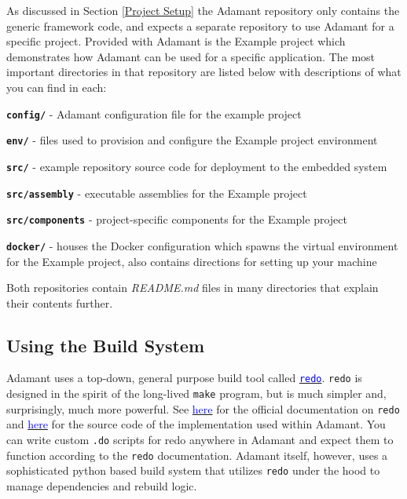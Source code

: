 \vspace{5mm} %

As discussed in Section \ref{Project Setup} the Adamant repository only contains the generic framework code, and expects a separate repository to use Adamant for a specific project. Provided with Adamant is the Example project which demonstrates how Adamant can be used for a specific application. The most important directories in that repository are listed below with descriptions of what you can find in each:

\vspace{5mm} %
\begin{spaceditemize}
  \item \textbf{\texttt{config/}} - Adamant configuration file for the example project
  \item \textbf{\texttt{env/}} - files used to provision and configure the Example project environment
  \item \textbf{\texttt{src/}} - example repository source code for deployment to the embedded system
  \item \textbf{\texttt{src/assembly}} - executable assemblies for the Example project
  \item \textbf{\texttt{src/components}} - project-specific components for the Example project
  \item \textbf{\texttt{docker/}} - houses the Docker configuration which spawns the virtual environment for the Example project, also contains directions for setting up your machine
\end{spaceditemize}
\vspace{5mm} %

Both repositories contain \textit{README.md} files in many directories that explain their contents further.

\subsection{Using the Build System} \label{Using the Build System}

Adamant uses a top-down, general purpose build tool called \href{https://redo.readthedocs.io/en/latest/}{\texttt{\textcolor{blue}{redo}}}. \texttt{redo} is designed in the spirit of the long-lived \texttt{make} program, but is much simpler and, surprisingly, much more powerful. See \href{https://redo.readthedocs.io/en/latest/}{{\textcolor{blue}{here}}} for the official documentation on \texttt{redo} and \href{https://github.com/dinkelk/redo}{{\textcolor{blue}{here}}} for the source code of the implementation used within Adamant. You can write custom \texttt{.do} scripts for redo anywhere in Adamant and expect them to function according to the \texttt{redo} documentation. Adamant itself, however, uses a sophisticated python based build system that utilizes \texttt{redo} under the hood to manage dependencies and rebuild logic. \\

